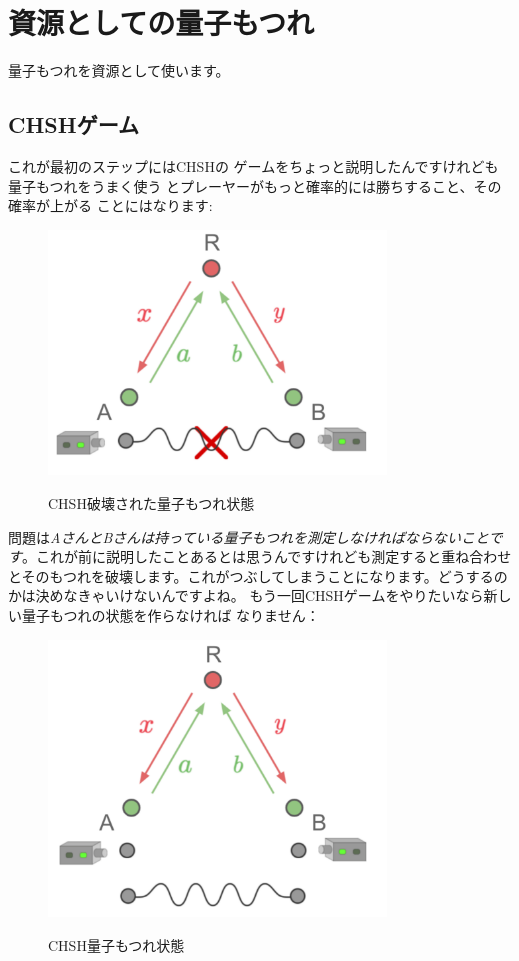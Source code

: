 \section{資源としての量子もつれ}
量子もつれを資源として使います。
\subsection{CHSHゲーム}
これが最初のステップにはCHSHの
ゲームをちょっと説明したんですけれども量子もつれをうまく使う
とプレーヤーがもっと確率的には勝ちすること、その確率が上がる
ことにはなります:
\begin{figure}[H]
   \centering
    \includegraphics[width=0.8\textwidth]{lesson4/CHSH_broken_entanglement.pdf}
    \label{fig: 1}
    \begin{center}
        \caption{CHSH破壊された量子もつれ状態}
    \end{center}
\end{figure}
問題は\textit{AさんとBさんは持っている量子もつれを測定しなければならないことです}。これが前に説明したことあるとは思うんですけれども測定すると重ね合わせとそのもつれを破壊します。これがつぶしてしまうことになります。どうするのかは決めなきゃいけないんですよね。
もう一回CHSHゲームをやりたいなら新しい量子もつれの状態を作らなければ
なりません：
\begin{figure}[H]
   \centering
    \includegraphics[width=0.8\textwidth]{lesson4/CHSH_new_connections.pdf}
    \label{fig: 1}
    \begin{center}
        \caption{CHSH量子もつれ状態}
    \end{center}
\end{figure}

